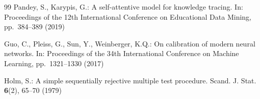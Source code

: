\documentclass[graybox]{SNmult}
\begin{document}
\begin{thebibliography}{99}
Pandey, S., Karypis, G.: A self-attentive model for knowledge tracing. In: Proceedings of
the 12th International Conference on Educational Data Mining, pp.~384--389 (2019)

Guo, C., Pleiss, G., Sun, Y., Weinberger, K.Q.: On calibration of modern neural networks.
In: Proceedings of the 34th International Conference on Machine Learning, pp.~1321--1330
(2017)

Holm, S.: A simple sequentially rejective multiple test procedure. Scand. J. Stat.
\textbf{6}(2), 65--70 (1979)

\end{thebibliography}
\end{document}
